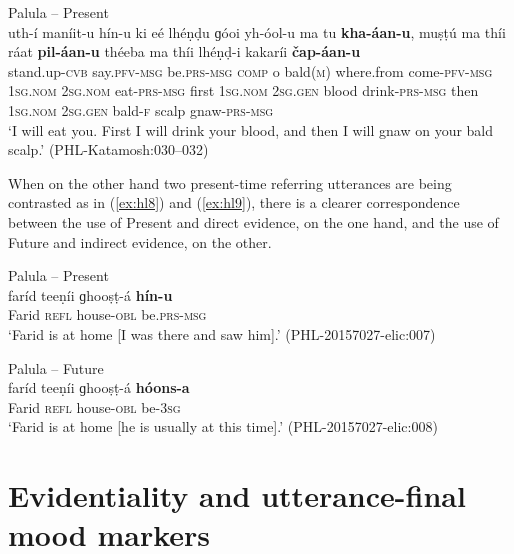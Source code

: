 \documentclass[output=paper]{langsci/langscibook}
\begin{document}
\begin{exe}
	\ex Palula -- Present \label{ex:hl7}\\
	\gll uth-í maníit-u hín-u ki eé lhéṇḍu ɡóoi yh-óol-u ma tu \textbf{kha-áan-u}, muṣṭú ma thíi ráat \textbf{pil-áan-u} théeba ma thíi lhéṇḍ-i kakaríi \textbf{čap-áan-u}\\
	stand.up-\textsc{cvb} say.\textsc{pfv}-\textsc{msg} be.\textsc{prs}-\textsc{msg} \textsc{comp} o bald(\textsc{m}) where.from come-\textsc{pfv}-\textsc{msg} 1\textsc{sg}.\textsc{nom} 2\textsc{sg}.\textsc{nom} eat-\textsc{prs}-\textsc{msg} first 1\textsc{sg}.\textsc{nom} 2\textsc{sg}.\textsc{gen} blood drink-\textsc{prs}-\textsc{msg} then 1\textsc{sg}.\textsc{nom} 2\textsc{sg}.\textsc{gen} bald-\textsc{f} scalp gnaw-\textsc{prs}-\textsc{msg}\\
	\trans ‘I will eat you. First I will drink your blood, and then I will gnaw on your bald scalp.’ (PHL-Katamosh:030–032)
\end{exe}

When on the other hand two present-time referring utterances are being contrasted as in ‎(\ref{ex:hl8}) and ‎(\ref{ex:hl9}), there is a clearer correspondence between the use of Present and direct evidence, on the one hand, and the use of Future and indirect evidence, on the other.

\begin{exe}
	\ex Palula -- Present \label{ex:hl8}\\
	\gll faríd teeṇíi ɡhooṣṭ-á \textbf{hín-u}\\
	Farid \textsc{refl} house-\textsc{obl} be.\textsc{prs}-\textsc{msg} \\
	\trans ‘Farid is at home [I was there and saw him].’ (PHL-20157027-elic:007)
\end{exe}


\begin{exe}
	\ex Palula -- Future \label{ex:hl9}\\
	\gll faríd teeṇíi ɡhooṣṭ-á \textbf{hóons-a}\\
	Farid \textsc{refl} house-\textsc{obl} be-3\textsc{sg}\\
	\trans ‘Farid is at home [he is usually at this time].’ (PHL-20157027-elic:008)
\end{exe}


\section{Evidentiality and utterance-final mood markers}\label{s:hl4}
\end{document}
